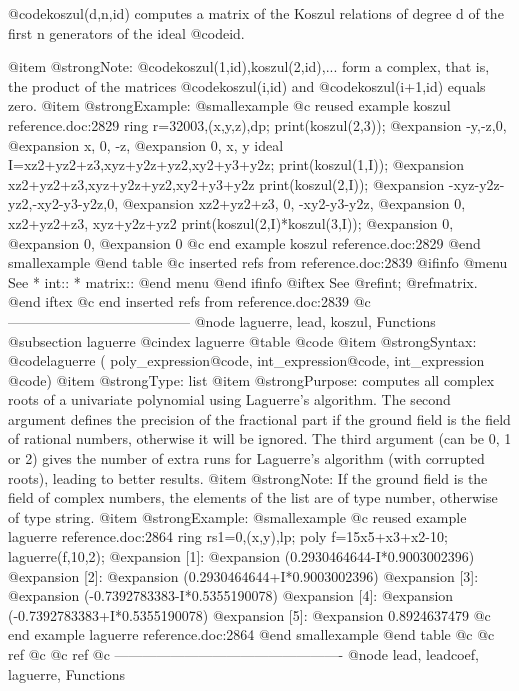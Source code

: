 {@code{koszul(d,n,id)} computes a matrix of the Koszul relations of degree d of
the first n generators of the ideal @code{id}.

@item @strong{Note:}
@code{koszul(1,id),koszul(2,id),...} form a complex, that is, the product
of the matrices @code{koszul(i,id)} and @code{koszul(i+1,id)} equals zero.
@item @strong{Example:}
@smallexample
@c reused example koszul reference.doc:2829 
  ring r=32003,(x,y,z),dp;
  print(koszul(2,3));
@expansion{} -y,-z,0, 
@expansion{} x, 0, -z,
@expansion{} 0, x, y  
  ideal I=xz2+yz2+z3,xyz+y2z+yz2,xy2+y3+y2z;
  print(koszul(1,I));
@expansion{} xz2+yz2+z3,xyz+y2z+yz2,xy2+y3+y2z
  print(koszul(2,I));
@expansion{} -xyz-y2z-yz2,-xy2-y3-y2z,0,          
@expansion{} xz2+yz2+z3,  0,          -xy2-y3-y2z,
@expansion{} 0,           xz2+yz2+z3, xyz+y2z+yz2 
  print(koszul(2,I)*koszul(3,I));
@expansion{} 0,
@expansion{} 0,
@expansion{} 0 
@c end example koszul reference.doc:2829
@end smallexample
@end table
@c inserted refs from reference.doc:2839
@ifinfo
@menu
See
* int::
* matrix::
@end menu
@end ifinfo
@iftex
See
@ref{int};
@ref{matrix}.
@end iftex
@c end inserted refs from reference.doc:2839
@c ---------------------------------------
@node laguerre, lead, koszul, Functions
@subsection laguerre
@cindex laguerre
@table @code
@item @strong{Syntax:}
@code{laguerre (} poly_expression@code{,} int_expression@code{,} int_expression @code{)}
@item @strong{Type:}
list
@item @strong{Purpose:}
computes all complex roots of a univariate polynomial using Laguerre's
algorithm. The second argument defines the precision of the fractional part
if the ground field is the field of rational numbers, otherwise it will be
ignored. The third argument (can be 0, 1 or 2) gives the number of extra runs
for Laguerre's algorithm (with corrupted roots), leading to better results.
@item @strong{Note:}
If the ground field is the field of complex numbers, the elements of the
list are of type number, otherwise of type string.
@item @strong{Example:}
@smallexample
@c reused example laguerre reference.doc:2864 
ring rs1=0,(x,y),lp;
poly f=15x5+x3+x2-10;
laguerre(f,10,2);
@expansion{} [1]:
@expansion{}    (0.2930464644-I*0.9003002396)
@expansion{} [2]:
@expansion{}    (0.2930464644+I*0.9003002396)
@expansion{} [3]:
@expansion{}    (-0.7392783383-I*0.5355190078)
@expansion{} [4]:
@expansion{}    (-0.7392783383+I*0.5355190078)
@expansion{} [5]:
@expansion{}    0.8924637479
@c end example laguerre reference.doc:2864
@end smallexample
@end table
@c @c ref
@c @c ref
@c -------------------------------------------------
@node lead, leadcoef, laguerre, Functions
}
